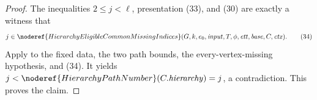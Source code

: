 \begin{proof}
The inequalities $2\le j<\ell$, presentation (33), and (30) are
exactly a witness that
\[
 j\in\noderef{HierarchyEligibleCommonMissingIndices}
       (G,k,e_0,\mathit{input},T,\phi,\mathit{ett},
        \mathit{base},C,\mathit{ctx}).                         \tag{34}
\]
Apply  to the fixed
data, the two path bounds, the every-vertex-missing hypothesis, and
(34).  It yields
$j<\noderef{HierarchyPathNumber}(C.\mathit{hierarchy})=j$, a
contradiction.  This proves the claim.
\end{proof}

